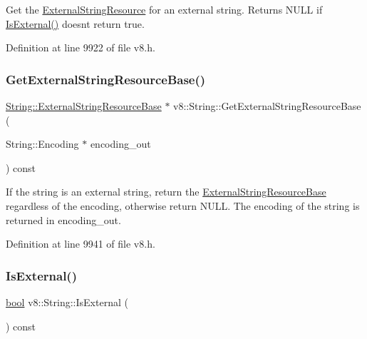 Get the \mbox{\hyperlink{classv8_1_1String_1_1ExternalStringResource}{External\+String\+Resource}} for an external string. Returns N\+U\+LL if \mbox{\hyperlink{classv8_1_1String_a1d24faa97c6168221ec362c395d41ce1}{Is\+External()}} doesn\textquotesingle{}t return true. 

Definition at line 9922 of file v8.\+h.

\mbox{\label{classv8_1_1String_a3031c6406f3f84bbc2d9810477a07489}} 
\subsubsection{\texorpdfstring{Get\+External\+String\+Resource\+Base()}{GetExternalStringResourceBase()}}
{\footnotesize\ttfamily \mbox{\hyperlink{classv8_1_1String_1_1ExternalStringResourceBase}{String\+::\+External\+String\+Resource\+Base}} $\ast$ v8\+::\+String\+::\+Get\+External\+String\+Resource\+Base (\begin{DoxyParamCaption}\item[{String\+::\+Encoding $\ast$}]{encoding\+\_\+out }\end{DoxyParamCaption}) const}

If the string is an external string, return the \mbox{\hyperlink{classv8_1_1String_1_1ExternalStringResourceBase}{External\+String\+Resource\+Base}} regardless of the encoding, otherwise return N\+U\+LL. The encoding of the string is returned in encoding\+\_\+out. 

Definition at line 9941 of file v8.\+h.

\mbox{\label{classv8_1_1String_a1d24faa97c6168221ec362c395d41ce1}} 
\subsubsection{\texorpdfstring{Is\+External()}{IsExternal()}}
{\footnotesize\ttfamily \mbox{\hyperlink{classbool}{bool}} v8\+::\+String\+::\+Is\+External (\begin{DoxyParamCaption}{ }\end{DoxyParamCaption}) const}

